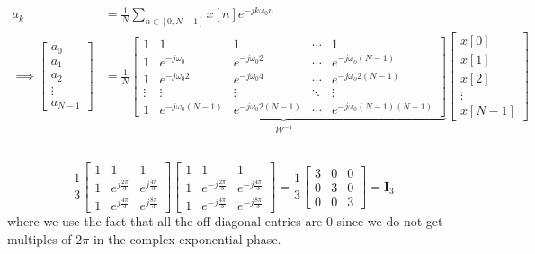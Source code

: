 \documentclass{article}
\begin{document}
\begin{align}
    a_k &= \frac{1}{N} \sum_{n \in [0, N - 1]} x[n] e^{-j k \omega_0 n} \\
    \implies
    \begin{bmatrix}
        a_0 \\
        a_1 \\
        a_2 \\
        \vdots \\
        a_{N - 1}    
    \end{bmatrix}
    &=
    \underbrace{\frac{1}{N} \begin{bmatrix}
        1 & 1 & 1 & \cdots & 1 \\
        1 & e^{-j \omega_0} & e^{-j \omega_0 2} & \cdots & e^{-j \omega_o (N - 1)} \\
        1 & e^{-j \omega_0 2} & e^{-j \omega_0 4} & \cdots & e^{-j \omega_o 2(N - 1)} \\
        \vdots & \vdots & \vdots & \ddots & \vdots \\
        1 & e^{-j \omega_0 (N - 1)} & e^{-j \omega_0 2(N - 1)} & \cdots & e^{-j \omega_0 (N - 1) (N - 1)}
    \end{bmatrix}}_{\mathcal{W}^{-1}}
    \begin{bmatrix}
        x[0] \\
        x[1] \\
        x[2] \\
        \vdots \\
        x[N - 1]
    \end{bmatrix}
\end{align}

\subsection{}

\begin{equation}
    \frac{1}{3}
    \begin{bmatrix}
        1 & 1 & 1 \\
        1 & e^{j \frac{2\pi}{3}} & e^{j \frac{4\pi}{3}} \\
        1 & e^{j \frac{4\pi}{3}} & e^{j \frac{8\pi}{3}}
    \end{bmatrix}
    \begin{bmatrix}
        1 & 1 & 1 \\
        1 & e^{-j \frac{2\pi}{3}} & e^{-j \frac{4\pi}{3}} \\
        1 & e^{-j \frac{4\pi}{3}} & e^{-j \frac{8\pi}{3}}
    \end{bmatrix}
    =
    \frac{1}{3} \begin{bmatrix}
        3 & 0 & 0 \\
        0 & 3 & 0 \\
        0 & 0 & 3
    \end{bmatrix} = \bm{I}_3
\end{equation}
where we use the fact that all the off-diagonal entries are \(0\) since we do not get multiples of \(2\pi\) in the complex exponential phase.
\end{document}
